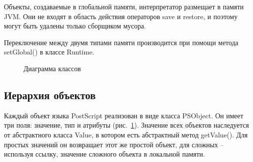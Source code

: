 Объекты, создаваемые в глобальной памяти, интерпретатор размещает в памяти JVM. Они не входят в область действия операторов save и restore, и поэтому могут быть удалены только сборщиком мусора.

Переключение между двумя типами памяти производится при помощи метода setGlobal() в классе Runtime.

\begin{figure}[t]
\caption{Диаграмма классов}\label{pic_Frame}
\end{figure}

\subsection{Иерархия объектов}

Каждый объект языка PostScript реализован в виде класса PSObject. Он имеет три поля: значение, тип и атрибуты (рис.~\ref{pic_Frame}). Значение всех объектов наследуется от абстрактного класса Value, в котором есть абстрактный метод getValue(). Для простых значений он возвращает этот же простой объект, для сложных -- используя ссылку, значение сложного объекта в локальной памяти. 

